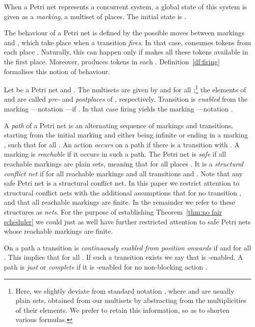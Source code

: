 \documentclass[smallcondensed]{svjour3}
\newcommand{\Thm}[1]{Theorem~\ref{thm:#1}}
\newcommand{\Def}[1]{Definition~\ref{df:#1}}
\begin{document}
\noindent
When a Petri net represents a concurrent
system, a global state of this system is given as a \emph{marking},
a multiset  of places. 
The initial state is .

The behaviour of a Petri net is defined by the possible moves between
markings  and , which take place when a transition  \emph{fires}.  In that case,
 consumes  tokens from each 
place .  Naturally, this can happen only if  makes all these
tokens available in the first place.  Moreover,  produces  tokens
in each .  \Def{firing} formalises this notion of behaviour.

\begin{definition}\label{df:firing}
Let  be a Petri net and .
The multisets  are given by  and
 for all ;\footnote{Here, we slightly deviate from
  standard notation \cite{Re85}, where  and  are usually plain sets,
obtained from our multisets by abstracting from the multiplicities of their elements. 
We prefer to retain this information, so as to shorten various formulas.}
the elements of  and  are
called \emph{pre-} and \emph{postplaces} of , respectively.
Transition  is \emph{enabled} from the marking ---notation
---if .
In that case firing  yields the marking 
\linebreak[3]---notation .
\end{definition}
A \emph{path}  of a Petri net  is an alternating sequence  of markings and
transitions, starting from the initial marking  and either being infinite or ending in a
marking , such that  for all .
An action  \emph{occurs} on a path  if there is a transition  with .
A marking is \emph{reachable} if it occurs in such a path.
The Petri net  is
\emph{safe} if all reachable markings  are plain sets, meaning that  for all places .
It is a \emph{structural conflict net} \cite{GGS11} if  for all reachable markings  and all transitions  and .
Note that any safe Petri net is a structural conflict net.
In this paper we restrict attention to structural conflict nets with the additional assumptions that  for no transition , 
and that all reachable markings are finite.
In the remainder we refer
to these structures as \emph{nets}. For the purpose of establishing \Thm{no fair scheduler} we could
just as well have further restricted attention to
safe Petri nets whose reachable markings are finite.

On a path  a transition  is \emph{continuously enabled from position  onwards} if
 and  for all .
This implies that  for all .
If such a transition  exists we say that  is -enabled.
A path is \emph{just} or \emph{complete} if it is -enabled for no non-blocking action .
\end{document}
